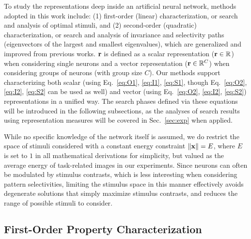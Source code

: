 \documentclass[10pt,twocolumn,letterpaper]{article}
\begin{document}
To study the representations deep inside an artificial neural network, methods adopted in this work include: (1) first-order (\ie linear) characterization, or search and analysis of optimal stimuli, and (2) second-order (\ie quadratic) characterization, or search and analysis of invariance and selectivity paths (\ie eigenvectors of the largest and smallest eigenvalues), which are generalized and improved from previous works.
$\bf{r}$ is defined as a scalar representation (\ie $\bf{r} \in \mathbb{R}$) when considering single neurons and a vector representation (\ie ${\bf{r}} \in \mathbb{R}^C$) when considering groups of neurons (with group size $C$).
Our methods support characterizing both scalar (using Eq.~\ref{eq:O1}, \ref{eq:I1}, \ref{eq:S1}, though Eq.~\ref{eq:O2}, \ref{eq:I2}, \ref{eq:S2} can be used as well) and vector (using Eq.~\ref{eq:O2}, \ref{eq:I2}, \ref{eq:S2}) representations in a unified way.
The search phases defined via these equations will be introduced in the following subsections, as the analyses of search results using representation measures will be covered in Sec.~\ref{sec:exp} when applied.


While no specific knowledge of the network itself is assumed, we do restrict the space of stimuli considered with a constant energy constraint $\left\| \bf{x} \right\| = E$, where $E$ is set to $1$ in all mathematical derivations for simplicity, but valued as the average energy of task-related images in our experiments.
Since neurons can often be modulated by stimulus contrasts, which is less interesting when considering pattern selectivities, limiting the stimulus space in this manner effectively avoids degenerate solutions that simply maximize stimulus contrasts, and reduces the range of possible stimuli to consider.


\subsection{First-Order Property Characterization}
\end{document}
